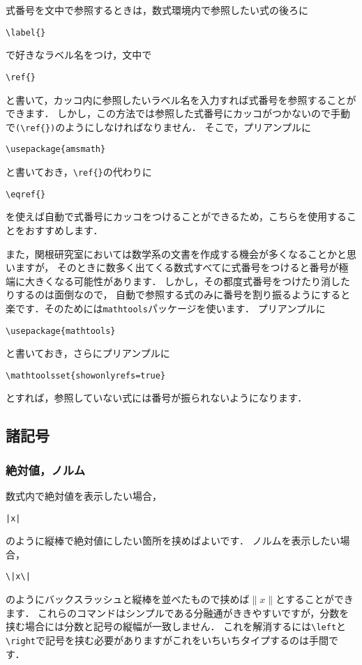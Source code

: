 \documentclass[a4paper,11pt,titlepage]{jsarticle}
\numberwithin{equation}{section}
\theoremstyle{definition}
\begin{document}
式番号を文中で参照するときは，数式環境内で参照したい式の後ろに
\begin{center}
    \verb|\label{}|
\end{center}
で好きなラベル名をつけ，文中で
\begin{center}
    \verb|\ref{}|
\end{center}
と書いて，カッコ内に参照したいラベル名を入力すれば式番号を参照することができます．
しかし，この方法では参照した式番号にカッコがつかないので手動で\verb|(\ref{})|のようにしなければなりません．
そこで，プリアンプルに
\begin{center}
    \verb|\usepackage{amsmath}|
\end{center}
と書いておき，\verb|\ref{}|の代わりに
\begin{center}
    \verb|\eqref{}|
\end{center}
を使えば自動で式番号にカッコをつけることができるため，こちらを使用することをおすすめします．

また，関根研究室においては数学系の文書を作成する機会が多くなることかと思いますが，
そのときに数多く出てくる数式すべてに式番号をつけると番号が極端に大きくなる可能性があります．
しかし，その都度式番号をつけたり消したりするのは面倒なので，
自動で参照する式のみに番号を割り振るようにすると楽です．そのためには\verb|mathtools|パッケージを使います．
プリアンプルに
\begin{center}
    \verb|\usepackage{mathtools}|
\end{center}
と書いておき，さらにプリアンプルに
\begin{center}
    \verb|\mathtoolsset{showonlyrefs=true}|
\end{center}
とすれば，参照していない式には番号が振られないようになります\cite{FomulaNumber}．

\subsection{諸記号}

\subsubsection{絶対値，ノルム}

数式内で絶対値を表示したい場合，
\begin{center}
    \verb+|x|+
\end{center}
のように縦棒で絶対値にしたい箇所を挟めばよいです．
ノルムを表示したい場合，
\begin{center}
    \verb+\|x\|+
\end{center}
のようにバックスラッシュと縦棒を並べたもので挟めば$\|x\|$とすることができます．
これらのコマンドはシンプルである分融通がききやすいですが，分数を挟む場合には分数と記号の縦幅が一致しません．
これを解消するには\verb|\left|と\verb|\right|で記号を挟む必要がありますがこれをいちいちタイプするのは手間です．
\end{document}
